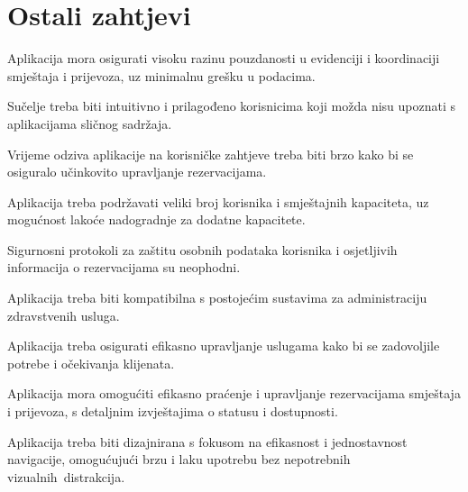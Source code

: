	
				
				\eject
	
		\section{Ostali zahtjevi}
		
			\begin{packed_item}
				\setlength\itemsep{10pt}
				\item Aplikacija mora osigurati visoku razinu pouzdanosti u evidenciji i koordinaciji smještaja i prijevoza, uz minimalnu grešku u podacima.
				\item Sučelje treba biti intuitivno i prilagođeno korisnicima koji možda nisu upoznati s aplikacijama sličnog sadržaja.
				\item Vrijeme odziva aplikacije na korisničke zahtjeve treba biti brzo kako bi se osiguralo učinkovito upravljanje rezervacijama.
				\item Aplikacija treba podržavati veliki broj korisnika i smještajnih kapaciteta, uz mogućnost lakoće nadogradnje za dodatne kapacitete.
				\item Sigurnosni protokoli za zaštitu osobnih podataka korisnika i osjetljivih informacija o rezervacijama su neophodni.
				\item Aplikacija treba biti kompatibilna s postojećim sustavima za administraciju zdravstvenih usluga.
				\item Aplikacija treba osigurati efikasno upravljanje uslugama kako bi se zadovoljile potrebe i očekivanja klijenata.
				\item Aplikacija mora omogućiti efikasno praćenje i upravljanje rezervacijama smještaja i prijevoza, s detaljnim izvještajima o statusu i dostupnosti.
				\item Aplikacija treba biti dizajnirana s fokusom na efikasnost i jednostavnost navigacije, omogućujući brzu i laku upotrebu bez nepotrebnih vizualnih distrakcija.
			\end{packed_item}
			 
			 
			 
	
